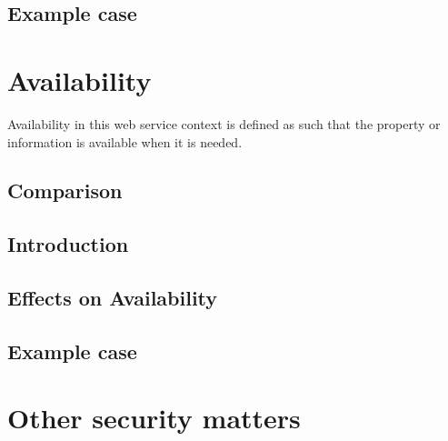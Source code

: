 \subsection{Example case}



\section{Availability}
\begin{sloppypar}
    Availability in this web service context is defined as such that the property or information 
    is available when it is needed.

    
    
\end{sloppypar}

\subsection{Comparison}
\begin{sloppypar}
    
\end{sloppypar}


\subsection{Introduction}
\begin{sloppypar}

\end{sloppypar}

\subsection{Effects on Availability}
\begin{sloppypar}

\end{sloppypar}

\subsection{Example case}
\begin{sloppypar}

\end{sloppypar}




\section{Other security matters}
